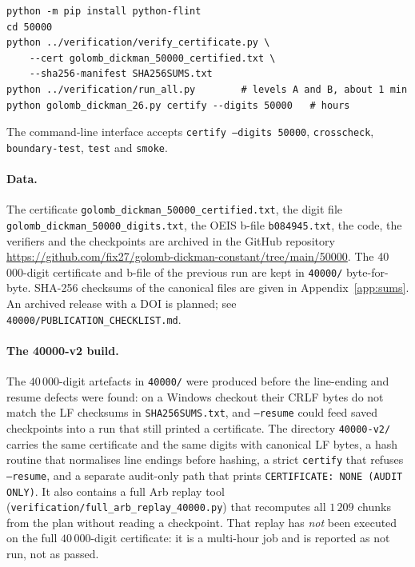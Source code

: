 \documentclass[11pt,a4paper]{article}
\theoremstyle{remark}
\begin{document}
\begin{lstlisting}
python -m pip install python-flint
cd 50000
python ../verification/verify_certificate.py \
    --cert golomb_dickman_50000_certified.txt \
    --sha256-manifest SHA256SUMS.txt
python ../verification/run_all.py        # levels A and B, about 1 min
python golomb_dickman_26.py certify --digits 50000   # hours
\end{lstlisting}

The command-line interface accepts
\texttt{certify --digits 50000}, \texttt{crosscheck},
\texttt{boundary-test}, \texttt{test} and \texttt{smoke}.

\paragraph{Data.}
The certificate \texttt{golomb\_dickman\_50000\_certified.txt}, the
digit file \texttt{golomb\_dickman\_50000\_digits.txt}, the OEIS b-file
\texttt{b084945.txt}, the code, the verifiers and the checkpoints are
archived in the GitHub repository
\url{https://github.com/fix27/golomb-dickman-constant/tree/main/50000}.
The 40\,000-digit certificate and b-file of the previous run are kept in
\texttt{40000/} byte-for-byte. SHA-256 checksums of the canonical files
are given in Appendix~\ref{app:sums}. An archived release with a DOI is
planned; see \texttt{40000/PUBLICATION\_CHECKLIST.md}.

\paragraph{The 40000-v2 build.}
The $40\,000$-digit artefacts in \texttt{40000/} were produced before the
line-ending and resume defects were found: on a Windows checkout their CRLF
bytes do not match the LF checksums in \texttt{SHA256SUMS.txt}, and
\texttt{--resume} could feed saved checkpoints into a run that still printed a
certificate. The directory \texttt{40000-v2/} carries the same certificate and
the same digits with canonical LF bytes, a hash routine that normalises line
endings before hashing, a strict \texttt{certify} that refuses
\texttt{--resume}, and a separate audit-only path that prints
\texttt{CERTIFICATE: NONE (AUDIT ONLY)}. It also contains a full Arb replay
tool (\texttt{verification/full\_arb\_replay\_40000.py}) that recomputes all
$1\,209$ chunks from the plan without reading a checkpoint. That replay has
\emph{not} been executed on the full $40\,000$-digit certificate: it is a
multi-hour job and is reported as not run, not as passed.
\end{document}
